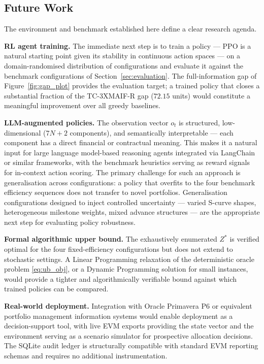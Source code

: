 \subsection{Future Work}
\label{subsec:future}

The environment and benchmark established here define a clear research
agenda.

\textbf{RL agent training.}
The immediate next step is to train a policy --- PPO \citep{Schulman2017}
is a natural starting point given its stability in continuous action
spaces --- on a domain-randomised distribution of configurations and
evaluate it against the benchmark configurations of
Section~\ref{sec:evaluation}. The full-information gap of
Figure~\ref{fig:gap_plot} provides the evaluation target; a trained
policy that closes a substantial fraction of the TC-3XMAIF-R gap
($72.15$ units) would constitute a meaningful improvement over all
greedy baselines.

\textbf{LLM-augmented policies.}
The observation vector $o_t$ is structured, low-dimensional
($7N + 2$ components), and semantically interpretable --- each
component has a direct financial or contractual meaning. This makes
it a natural input for large language model-based reasoning agents
integrated via LangChain or similar frameworks, with the benchmark
heuristics serving as reward signals for in-context action scoring.
The primary challenge for such an approach is generalisation across
configurations: a policy that overfits to the four benchmark
efficiency sequences does not transfer to novel portfolios. Generalisation
configurations designed to inject controlled uncertainty --- varied
S-curve shapes, heterogeneous milestone weights, mixed advance
structures --- are the appropriate next step for evaluating policy
robustness.

\textbf{Formal algorithmic upper bound.}
The exhaustively enumerated $Z^*$ is verified optimal for the four
fixed-efficiency configurations but does not extend to stochastic settings. A Linear
Programming relaxation of the deterministic oracle problem
\eqref{eq:ub_obj}, or a Dynamic Programming solution for small
instances, would provide a tighter and algorithmically verifiable
bound against which trained policies can be compared.

\textbf{Real-world deployment.}
Integration with Oracle Primavera P6 or equivalent portfolio management
information systems would enable deployment as a decision-support
tool, with live EVM exports providing the state vector and the
environment serving as a scenario simulator for prospective allocation
decisions. The SQLite audit ledger is structurally compatible with
standard EVM reporting schemas and requires no additional instrumentation.